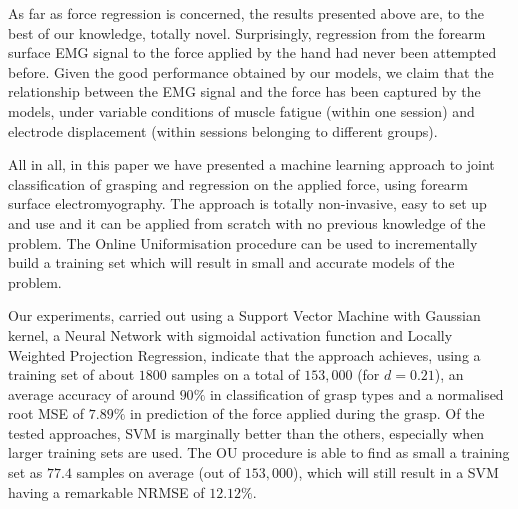 As far as force regression is concerned, the results presented above
are, to the best of our knowledge, totally novel. Surprisingly,
regression from the forearm surface EMG signal to the force applied by
the hand had never been attempted before. Given the good performance
obtained by our models, we claim that the relationship between the EMG
signal and the force has been captured by the models, under variable
conditions of muscle fatigue (within one session) and electrode
displacement (within sessions belonging to different groups).

All in all, in this paper we have presented a machine learning
approach to joint classification of grasping and regression on the
applied force, using forearm surface electromyography. The approach is
totally non-invasive, easy to set up and use and it can be applied
from scratch with no previous knowledge of the problem. The Online
Uniformisation procedure can be used to incrementally build a training
set which will result in small and accurate models of the problem.

Our experiments, carried out using a Support Vector Machine with
Gaussian kernel, a Neural Network with sigmoidal activation function
and Locally Weighted Projection Regression, indicate that the approach
achieves, using a training set of about $1800$ samples on a total of
$153,000$ (for $d=0.21$), an average accuracy of around $90\%$ in
classification of grasp types and a normalised root MSE of $7.89\%$ in
prediction of the force applied during the grasp. Of the tested
approaches, SVM is marginally better than the others, especially when
larger training sets are used. The OU procedure is able to find as
small a training set as $77.4$ samples on average (out of $153,000$),
which will still result in a SVM having a remarkable NRMSE of
$12.12\%$.
